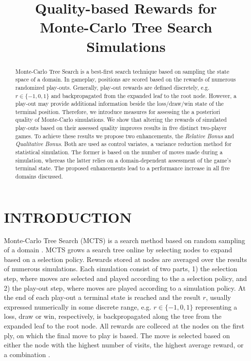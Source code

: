 \documentclass{ecai2014}
\begin{document}
\title{Quality-based Rewards for \\ Monte-Carlo Tree Search Simulations}


\maketitle


\begin{abstract}
Monte-Carlo Tree Search is a best-first search technique based on sampling the state space of a domain. In gameplay, positions are scored based on the rewards of numerous randomized play-outs. Generally, play-out rewards are defined discretely, e.g. $r \in \{-1, 0, 1\}$ and backpropagated from the expanded leaf to the root node. However, a play-out may provide additional information beside the loss/draw/win state of the terminal position. Therefore, we introduce measures for assessing the a posteriori quality of Monte-Carlo simulations. We show that altering the rewards of simulated play-outs based on their assessed quality improves results in five distinct two-player games. To achieve these results we propose two enhancements, the \emph{Relative Bonus} and \emph{Qualitative Bonus}. Both are used as control variates, a variance reduction method for statistical simulation. The former is based on the number of moves made during a simulation, whereas the latter relies on a domain-dependent assessment of the game's terminal state. The proposed enhancements lead to a performance increase in all five domains discussed.
\end{abstract}

\section{INTRODUCTION}
\label{sec:intro}
Monte-Carlo Tree Search (MCTS) is a search method based on random sampling of a domain \cite{coulom2007efficient,kocsis2006bandit}. MCTS grows a search tree online by selecting nodes to expand based on a selection policy. Rewards stored at nodes are averaged over the results of numerous simulations. Each simulation consist of two parts, 1) the selection step, where moves are selected and played according to the a selection policy, and 2) the play-out step, where moves are played according to a simulation policy. At the end of each play-out a terminal state is reached and the result $r$, usually expressed numerically in some discrete range, e.g. $r \in \{-1, 0, 1\}$ representing a loss, draw or win, respectively, is backpropagated along the tree from the expanded leaf to the root node. All rewards are colleced at the nodes on the first ply, on which the final move to play is based. The move is selected based on either the node with the highest number of visits, the highest average reward, or a combination \cite{chaslot2008progressive}. 
\end{document}
